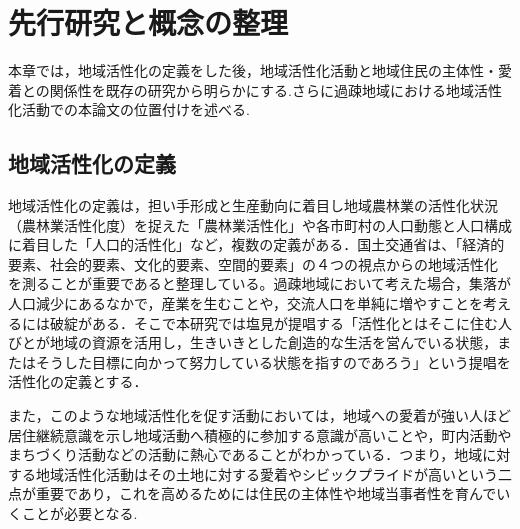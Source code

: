 \documentclass[a4paper]{jsarticle}
\begin{document}
\section{先行研究と概念の整理}
本章では，地域活性化の定義をした後，地域活性化活動と地域住民の主体性・愛着との関係性を既存の研究から明らかにする.さらに過疎地域における地域活性化活動での本論文の位置付けを述べる.
\subsection{地域活性化の定義}
地域活性化の定義は，担い手形成と生産動向に着目し地域農林業の活性化状況（農林業活性化度）を捉えた「農林業活性化」や各市町村の人口動態と人口構成に着目した「人口的活性化」など，複数の定義がある．国土交通省は、「経済的
要素、社会的要素、文化的要素、空間的要素」の４つの視点からの地域活性化
を測ることが重要である\cite{kasseika}と整理している。過疎地域において考えた場合，集落が人口減少にあるなかで，産業を生むことや，交流人口を単純に増やすことを考えるには破綻がある．そこで本研究では塩見\cite{shiomi}が提唱する「活性化とはそこに住む人びとが地域の資源を活用し，生きいきとした創造的な生活を営んでいる状態，またはそうした目標に向かって努力している状態を指すのであろう」という提唱を活性化の定義とする．\par
また，このような地域活性化を促す活動においては，地域への愛着が強い人ほど居住継続意識を示し地域活動へ積極的に参加する意識が高いことや，町内活動やまちづくり活動などの活動に熱心であること\cite{7}がわかっている．つまり，地域に対する地域活性化活動はその土地に対する愛着やシビックプライドが高いという二点が重要であり，これを高めるためには住民の主体性や地域当事者性を育んでいくことが必要となる.\par
\end{document}
